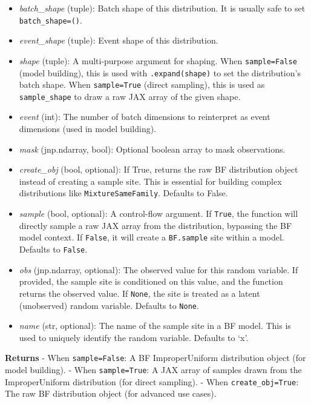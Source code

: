 \documentclass[
  letterpaper,
  DIV=11,
  numbers=noendperiod]{scrartcl}
\begin{document}
\begin{itemize}
\item
  \emph{batch\_shape} (tuple): Batch shape of this distribution. It is
  usually safe to set \texttt{batch\_shape=()}.
\item
  \emph{event\_shape} (tuple): Event shape of this distribution.
\item
  \emph{shape} (tuple): A multi-purpose argument for shaping. When
  \texttt{sample=False} (model building), this is used with
  \texttt{.expand(shape)} to set the distribution's batch shape. When
  \texttt{sample=True} (direct sampling), this is used as
  \texttt{sample\_shape} to draw a raw JAX array of the given shape.
\item
  \emph{event} (int): The number of batch dimensions to reinterpret as
  event dimensions (used in model building).
\item
  \emph{mask} (jnp.ndarray, bool): Optional boolean array to mask
  observations.
\item
  \emph{create\_obj} (bool, optional): If True, returns the raw BF
  distribution object instead of creating a sample site. This is
  essential for building complex distributions like
  \texttt{MixtureSameFamily}. Defaults to False.
\item
  \emph{sample} (bool, optional): A control-flow argument. If
  \texttt{True}, the function will directly sample a raw JAX array from
  the distribution, bypassing the BF model context. If \texttt{False},
  it will create a \texttt{BF.sample} site within a model. Defaults to
  \texttt{False}.
\item
  \emph{obs} (jnp.ndarray, optional): The observed value for this random
  variable. If provided, the sample site is conditioned on this value,
  and the function returns the observed value. If \texttt{None}, the
  site is treated as a latent (unobserved) random variable. Defaults to
  \texttt{None}.
\item
  \emph{name} (str, optional): The name of the sample site in a BF
  model. This is used to uniquely identify the random variable. Defaults
  to `x'.
\end{itemize}

\textbf{Returns} - When \texttt{sample=False}: A BF ImproperUniform
distribution object (for model building). - When \texttt{sample=True}: A
JAX array of samples drawn from the ImproperUniform distribution (for
direct sampling). - When \texttt{create\_obj=True}: The raw BF
distribution object (for advanced use cases).
\end{document}
